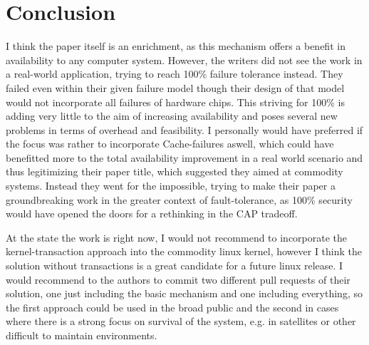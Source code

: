 \documentclass[a4paper,10pt,twoside]{article}
\begin{document}
\section{Conclusion}

I think the paper itself is an enrichment, as this mechanism offers a benefit in availability to any computer system. However, the writers did not see the work in a real-world application, trying to reach 100\% failure tolerance instead. They failed even within their given failure model though their design of that model would not incorporate all failures of hardware chips. This striving for 100\% is adding very little to the aim of increasing availability and poses several new problems in terms of overhead and feasibility. I personally would have preferred if the focus was rather to incorporate Cache-failures aswell, which could have benefitted more to the total availability improvement in a real world scenario and thus legitimizing their paper title, which suggested they aimed at commodity systems. Instead they went for the impossible, trying to make their paper a groundbreaking work in the greater context of fault-tolerance, as 100\% security would have opened the doors for a rethinking in the CAP tradeoff.

At the state the work is right now, I would not recommend to incorporate the kernel-transaction approach into the commodity linux kernel, however I think the solution without transactions is a great candidate for a future linux release. I would recommend to the authors to commit two different pull requests of their solution, one just including the basic mechanism and one including everything, so the first approach could be used in the broad public and the second in cases where there is a strong focus on survival of the system, e.g. in satellites or other difficult to maintain environments.


 
\end{document}
